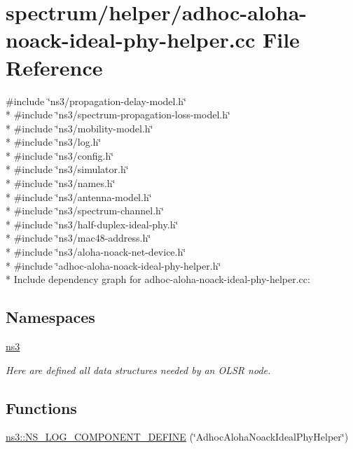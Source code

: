 \hypertarget{adhoc-aloha-noack-ideal-phy-helper_8cc}{}\section{spectrum/helper/adhoc-\/aloha-\/noack-\/ideal-\/phy-\/helper.cc File Reference}
\label{adhoc-aloha-noack-ideal-phy-helper_8cc}
{\ttfamily \#include \char`\"{}ns3/propagation-\/delay-\/model.\+h\char`\"{}}\\*
{\ttfamily \#include \char`\"{}ns3/spectrum-\/propagation-\/loss-\/model.\+h\char`\"{}}\\*
{\ttfamily \#include \char`\"{}ns3/mobility-\/model.\+h\char`\"{}}\\*
{\ttfamily \#include \char`\"{}ns3/log.\+h\char`\"{}}\\*
{\ttfamily \#include \char`\"{}ns3/config.\+h\char`\"{}}\\*
{\ttfamily \#include \char`\"{}ns3/simulator.\+h\char`\"{}}\\*
{\ttfamily \#include \char`\"{}ns3/names.\+h\char`\"{}}\\*
{\ttfamily \#include \char`\"{}ns3/antenna-\/model.\+h\char`\"{}}\\*
{\ttfamily \#include \char`\"{}ns3/spectrum-\/channel.\+h\char`\"{}}\\*
{\ttfamily \#include \char`\"{}ns3/half-\/duplex-\/ideal-\/phy.\+h\char`\"{}}\\*
{\ttfamily \#include \char`\"{}ns3/mac48-\/address.\+h\char`\"{}}\\*
{\ttfamily \#include \char`\"{}ns3/aloha-\/noack-\/net-\/device.\+h\char`\"{}}\\*
{\ttfamily \#include \char`\"{}adhoc-\/aloha-\/noack-\/ideal-\/phy-\/helper.\+h\char`\"{}}\\*
Include dependency graph for adhoc-\/aloha-\/noack-\/ideal-\/phy-\/helper.cc\+:
\subsection*{Namespaces}
\begin{DoxyCompactItemize}
\item 
 \hyperlink{namespacens3}{ns3}
\begin{DoxyCompactList}\small\item\em Here are defined all data structures needed by an O\+L\+SR node. \end{DoxyCompactList}\end{DoxyCompactItemize}
\subsection*{Functions}
\begin{DoxyCompactItemize}
\item 
\hyperlink{namespacens3_a854a6157e4df19abc8cafa952313a94d}{ns3\+::\+N\+S\+\_\+\+L\+O\+G\+\_\+\+C\+O\+M\+P\+O\+N\+E\+N\+T\+\_\+\+D\+E\+F\+I\+NE} (\char`\"{}Adhoc\+Aloha\+Noack\+Ideal\+Phy\+Helper\char`\"{})
\end{DoxyCompactItemize}
